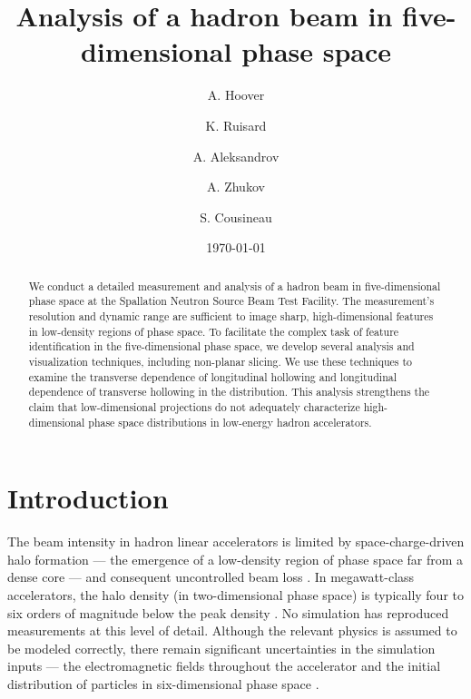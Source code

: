 \documentclass[%
 reprint,
 amsmath,amssymb,
 aps,
prstab,
]{revtex4-2}
\begin{document}

\title{Analysis of a hadron beam in five-dimensional phase space}

\author{A. Hoover}%
\author{K. Ruisard}%
\author{A. Aleksandrov}%
\author{A. Zhukov}%
\author{S. Cousineau}

\date{\today}


\begin{abstract}

We conduct a detailed measurement and analysis of a hadron beam in five-dimensional phase space at the Spallation Neutron Source Beam Test Facility. The measurement's resolution and dynamic range are sufficient to image sharp, high-dimensional features in low-density regions of phase space. To facilitate the complex task of feature identification in the five-dimensional phase space, we develop several analysis and visualization techniques, including non-planar slicing. We use these techniques to examine the transverse dependence of longitudinal hollowing and longitudinal dependence of transverse hollowing in the distribution. This analysis strengthens the claim that low-dimensional projections do not adequately characterize high-dimensional phase space distributions in low-energy hadron accelerators.

\end{abstract}

\maketitle




\section{Introduction}\label{sec:1}

The beam intensity in hadron linear accelerators is limited by space-charge-driven halo formation --- the emergence of a low-density region of phase space far from a dense core \cite{Gluckstern1994, Wangler1998, Batygin2021} --- and consequent uncontrolled beam loss \cite{Cousineau2015}. In megawatt-class accelerators, the halo density (in two-dimensional phase space) is typically four to six orders of magnitude below the peak density \cite{Aleksandrov2020}. No simulation has reproduced measurements at this level of detail. Although the relevant physics is assumed to be modeled correctly, there remain significant uncertainties in the simulation inputs --- the electromagnetic fields throughout the accelerator and the initial distribution of particles in six-dimensional phase space \cite{Allen2002, Qiang2002, Groening2008}. 
\end{document}
